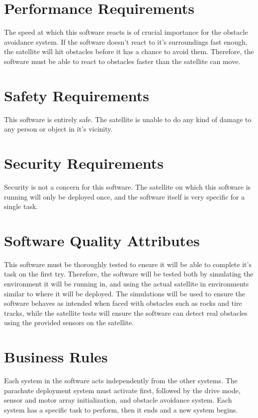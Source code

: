 \documentclass{scrreprt}
\begin{document}
\section{Performance Requirements}
The speed at which this software reacts is of crucial importance for the obstacle avoidance system. If the software doesn't react to it's surroundings fast enough, the satellite will hit obstacles before it has a chance to avoid them. Therefore, the software must be able to react to obstacles faster than the satellite can move. 

\section{Safety Requirements}
This software is entirely safe. The satellite is unable to do any kind of damage to any person or object in it's vicinity.

\section{Security Requirements}
Security is not a concern for this software. The satellite on which this software is running will only be deployed once, and the software itself is very specific for a single task. 

\section{Software Quality Attributes}
This software must be thoroughly tested to ensure it will be able to complete it's task on the first try. Therefore, the software will be tested both by simulating the environment it will be running in, and using the actual satellite in environments similar to where it will be deployed. The simulations will be used to ensure the software behaves as intended when faced with obstacles such as rocks and tire tracks, while the satellite tests will ensure the software can detect real obstacles using the provided sensors on the satellite.

\section{Business Rules}
Each system in the software acts independently from the other systems. The parachute deployment system must activate first, followed by the drive mode, sensor and motor array initialization, and obstacle avoidance system. Each system has a specific task to perform, then it ends and a new system begins.
\end{document}
